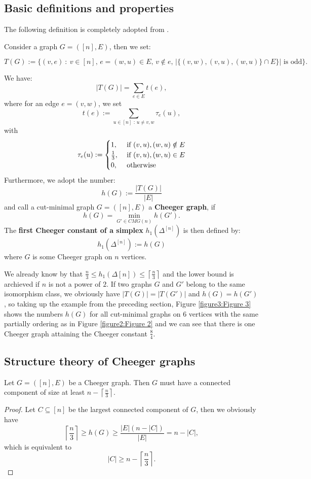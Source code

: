 \subsection{Basic definitions and properties}
The following definition is completely adopted from \cite{1}.
\begin{defi}\label{definition1}
Consider a graph \(G=([n],E)\), then we set:
\begin{small}
\[
T(G):=\{(v,e)\: :\: v\in [n]\text{, }e=(w,u)\in E\text{, }v\notin e\text{, }|\{(v,w),(v,u),(w,u)\}\cap E\}|\text{ is odd}\}.
\]
\end{small}
We have:
\[
|T(G)|=\sum\limits_{e\in E}t(e),
\]
where for an edge \(e=(v,w)\), we set
\[
t(e):=\sum\limits_{u\in[n]\text{ : }u\neq v,w}\tau_e(u),
\]
with
\begin{equation}
\tau_e(u):=
\begin{cases}
1,&\text{ if }(v,u),(w,u)\notin E\notag\\
\frac{1}{3},&\text{ if }(v,u),(w,u)\in E\notag\\
0,&\text{ otherwise}\notag
\end{cases}
\end{equation}
Furthermore, we adopt the number:
\[
h(G):=\frac{|T(G)|}{|E|}
\]
and call a cut-minimal graph \(G=([n],E)\) a \textbf{Cheeger graph}, if
\[
h(G)=\min\limits_{G'\in CMG(n)}h(G').
\]
The \textbf{first Cheeger constant of a simplex} \(h_1(\Delta^{[n]})\) is then defined by:
\[
h_1(\Delta^{[n]}):=h(G)
\]
where \(G\) is some Cheeger graph on \(n\) vertices.
\end{defi}
We already know by \cite{1} that \(\frac{n}{3}\leq h_1(\Delta{[n]})\leq\left\lceil\frac{n}{3}\right\rceil\) and the lower bound is archieved if \(n\) is not a power of \(2\). If two graphs \(G\) and \(G'\) belong to the same isomorphism class, we obviously have \(|T(G)|=|T(G')|\) and \(h(G)=h(G')\), so taking up the example from the preceding section, Figure \ref{figure3:Figure 3} shows the numbers \(h(G)\) for all cut-minimal graphs on \(6\) vertices with the same partially ordering as in Figure \ref{figure2:Figure 2} and we can see that there is one Cheeger graph attaining the Cheeger constant \(\frac{8}{4}\).



\subsection{Structure theory of Cheeger graphs}

\begin{prop}
Let \(G=([n],E)\) be a Cheeger graph. Then \(G\) must have a connected component of size at least \(n-\left\lceil\frac{n}{3}\right\rceil\).
\begin{proof}
Let \(C\subseteq [n]\) be the largest connected component of \(G\), then we obviously have
\[
\left\lceil\frac{n}{3}\right\rceil\geq h(G)\geq \frac{|E|(n-|C|)}{|E|}=n-|C|,
\]
which is equivalent to
\[
|C|\geq n-\left\lceil\frac{n}{3}\right\rceil.
\]
\end{proof}
\end{prop}

